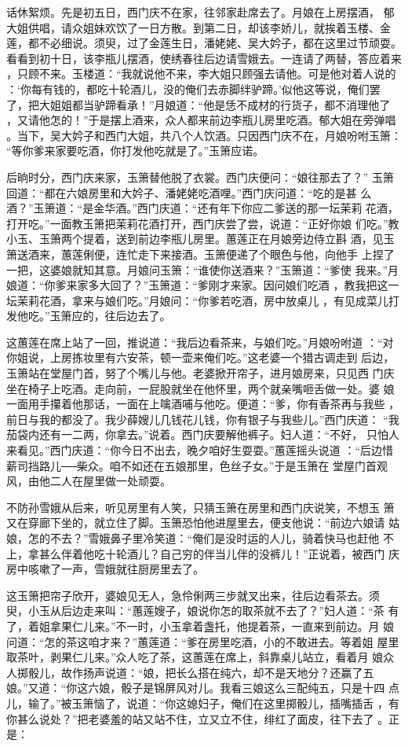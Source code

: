 话休絮烦。先是初五日，西门庆不在家，往邻家赴席去了。月娘在上房摆酒，
郁大姐供唱，请众姐妹欢饮了一日方散。到第二日，却该李娇儿，就挨着玉楼、金
莲，都不必细说。须臾，过了金莲生日，潘姥姥、吴大妗子，都在这里过节顽耍。
看看到初十日，该李瓶儿摆酒，使绣春往后边请雪娥去。一连请了两替，答应着来
，只顾不来。玉楼道：“我就说他不来，李大姐只顾强去请他。可是他对着人说的
：‘你每有钱的，都吃十轮酒儿，没的俺们去赤脚绊驴蹄。’似他这等说，俺们罢
了，把大姐姐都当驴蹄看承！”月娘道：“他是恁不成材的行货子，都不消理他了
，又请他怎的！”于是摆上酒来，众人都来前边李瓶儿房里吃酒。郁大姐在旁弹唱
。当下，吴大妗子和西门大姐，共八个人饮酒。只因西门庆不在，月娘吩咐玉箫：
“等你爹来家要吃酒，你打发他吃就是了。”玉箫应诺。

后晌时分，西门庆来家，玉箫替他脱了衣裳。西门庆便问：“娘往那去了？”
玉箫回道：“都在六娘房里和大妗子、潘姥姥吃酒哩。”西门庆问道：“吃的是甚
么酒？”玉箫道：“是金华酒。”西门庆道：“还有年下你应二爹送的那一坛茉莉
花酒，打开吃。”一面教玉箫把茉莉花酒打开，西门庆尝了尝，说道：“正好你娘
们吃。”教小玉、玉箫两个提着，送到前边李瓶儿房里。蕙莲正在月娘旁边侍立斟
酒，见玉箫送酒来，蕙莲俐便，连忙走下来接酒。玉箫便递了个眼色与他，向他手
上捏了一把，这婆娘就知其意。月娘问玉箫：“谁使你送酒来？”玉箫道：“爹使
我来。”月娘道：“你爹来家多大回了？”玉箫道：“爹刚才来家。因问娘们吃酒
，教我把这一坛茉莉花酒，拿来与娘们吃。”月娘问：“你爹若吃酒，房中放桌儿
，有见成菜儿打发他吃。”玉箫应的，往后边去了。

这蕙莲在席上站了一回，推说道：“我后边看茶来，与娘们吃。”月娘吩咐道
：“对你姐说，上房拣妆里有六安茶，顿一壶来俺们吃。”这老婆一个猎古调走到
后边，玉箫站在堂屋门首，努了个嘴儿与他。老婆掀开帘子，进月娘房来，只见西
门庆坐在椅子上吃酒。走向前，一屁股就坐在他怀里，两个就亲嘴咂舌做一处。婆
娘一面用手攥着他那话，一面在上噙酒哺与他吃。便道：“爹，你有香茶再与我些
，前日与我的都没了。我少薛嫂儿几钱花儿钱，你有银子与我些儿。”西门庆道：
“我茄袋内还有一二两，你拿去。”说着。西门庆要解他裤子。妇人道：“不好，
只怕人来看见。”西门庆道：“你今日不出去，晚夕咱好生耍耍。”蕙莲摇头说道
：“后边惜薪司挡路儿──柴众。咱不如还在五娘那里，色丝子女。”于是玉箫在
堂屋门首观风，由他二人在屋里做一处顽耍。

不防孙雪娥从后来，听见房里有人笑，只猜玉箫在房里和西门庆说笑，不想玉
箫又在穿廊下坐的，就立住了脚。玉箫恐怕他进屋里去，便支他说：“前边六娘请
姑娘，怎的不去？”雪娥鼻子里冷笑道：“俺们是没时运的人儿，骑着快马也赶他
不上，拿甚么伴着他吃十轮酒儿？自己穷的伴当儿伴的没裤儿！”正说着，被西门
庆房中咳嗽了一声，雪娥就往厨房里去了。

这玉箫把帘子欣开，婆娘见无人，急伶俐两三步就叉出来，往后边看茶去。须
臾，小玉从后边走来叫：“蕙莲嫂子，娘说你怎的取茶就不去了？”妇人道：“茶
有了，着姐拿果仁儿来。”不一时，小玉拿着盏托，他提着茶，一直来到前边。月
娘问道：“怎的茶这咱才来？”蕙莲道：“爹在房里吃酒，小的不敢进去。等着姐
屋里取茶叶，剥果仁儿来。”众人吃了茶，这蕙莲在席上，斜靠桌儿站立，看着月
娘众人掷骰儿，故作扬声说道：“娘，把长么搭在纯六，却不是天地分？还赢了五
娘。”又道：“你这六娘，骰子是锦屏风对儿。我看三娘这么三配纯五，只是十四
点儿，输了。”被玉箫恼了，说道：“你这媳妇子，俺们在这里掷骰儿，插嘴插舌
，有你甚么说处？”把老婆羞的站又站不住，立又立不住，绯红了面皮，往下去了
。正是：

